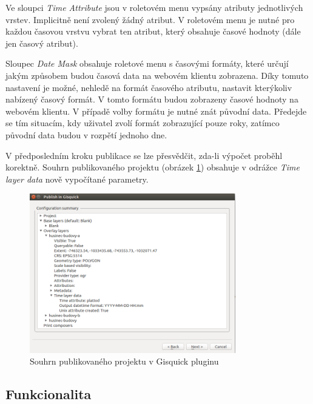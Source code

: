 Ve sloupci \textit{Time Attribute} jsou v roletovém menu vypsány
atributy jednotlivých vrstev. Implicitně není zvolený žádný atribut. 
V roletovém menu je nutné pro každou časovou vrstvu vybrat ten 
atribut, který obsahuje časové hodnoty (dále jen časový atribut).

Sloupec \textit{Date Mask} obsahuje roletové menu s časovými formáty,
které určují jakým způsobem budou časová data na webovém klientu
zobrazena. Díky tomuto nastavení je možné, nehledě na formát časového
atributu, nastavit kterýkoliv nabízený časový formát. V tomto formátu
budou zobrazeny časové hodnoty na webovém klientu. V případě volby
formátu je nutné znát původní data. Předejde se tím situacím, kdy
uživatel zvolí formát zobrazující pouze roky, zatímco původní data
budou v rozpětí jednoho dne.

V předposledním kroku publikace se lze přesvědčit, zda-li výpočet 
proběhl korektně. Souhrn publikovaného projektu (obrázek 
\ref{fig:summary}) obsahuje v odrážce \textit{Time layer data} nově 
vypočítané parametry.

\begin{figure}[h!]
	\centering
	\includegraphics[width=0.8\textwidth]{../img/project-publishing-time-summary.png}
	\caption{Souhrn publikovaného projektu v Gisquick pluginu}
	\label{fig:summary}
\end{figure}

\subsection{Funkcionalita}
\label{sssec:plugin-functionality}

